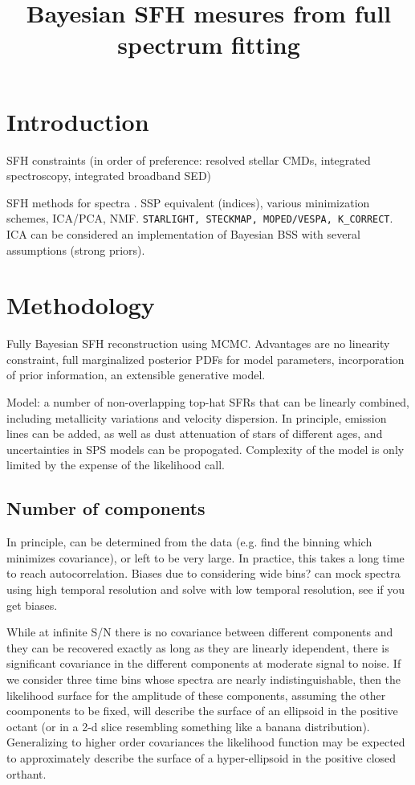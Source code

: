 \title{Bayesian SFH mesures from full spectrum fitting}


\section{Introduction}
\citet{tinsley68}

SFH constraints (in order of preference: resolved stellar CMDs, integrated spectroscopy, integrated broadband SED)

SFH methods for spectra \citep{walcher2011}.  SSP equivalent (indices), various minimization schemes, ICA/PCA, NMF. \texttt{STARLIGHT, STECKMAP, MOPED/VESPA, K_CORRECT}.  ICA can be considered an implementation of Bayesian BSS with several assumptions (strong priors).

\section{Methodology}
Fully Bayesian SFH reconstruction using MCMC.  Advantages are no linearity constraint, full marginalized posterior PDFs for model parameters, incorporation of prior information, an extensible generative model.

Model:  a number of non-overlapping top-hat SFRs that can be linearly combined, including metallicity variations and velocity dispersion.  In principle, emission lines can be added, as well as dust attenuation of stars of different ages, and uncertainties in SPS models can be propogated.  Complexity of the model is only limited by the expense of the likelihood call.

\subsection{Number of components}
In principle, can be determined from the data (e.g. find the binning which minimizes covariance), or left to be very large.  In practice, this takes a long time to reach autocorrelation. Biases due to considering wide bins?  can mock spectra using high temporal resolution and solve with low temporal resolution, see if you get biases.

While at infinite S/N there is no covariance between different components and they can be recovered exactly as long as they are linearly idependent, there is significant covariance in the different components at moderate signal to noise.  If we consider three time bins whose spectra are nearly indistinguishable, then the likelihood surface for the amplitude of these components, assuming the other coomponents to be fixed, will describe the surface of an ellipsoid in the positive octant (or in a 2-d slice resembling something like a banana distribution).  Generalizing to higher order covariances the likelihood function may be expected to approximately describe the surface of a hyper-ellipsoid in the positive closed orthant.

